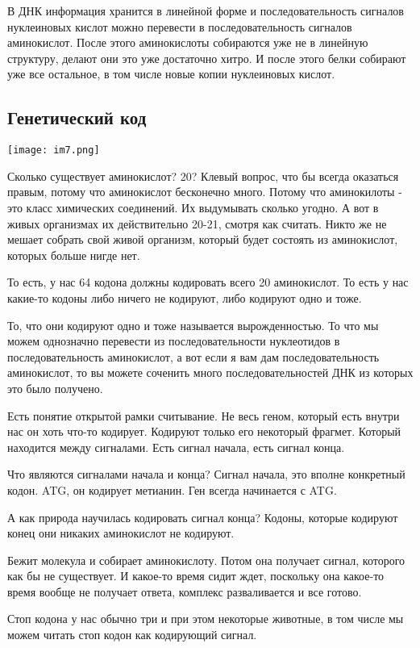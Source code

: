 В ДНК информация хранится в линейной форме и последовательность сигналов
нуклеиновых кислот можно перевести в последовательность сигналов
аминокислот. После этого аминокислоты собираются уже не в линейную структуру,
делают они это уже достаточно хитро. И после этого белки собирают
уже все остальное, в том числе новые копии нуклеиновых кислот.

  
\subsection{Генетический код}
\texttt{[image: im7.png]}

Сколько существует аминокислот?
20?
Клевый вопрос, что бы всегда оказаться правым, потому что
аминокислот бесконечно много. Потому что аминокилоты - это
класс химических соединений. Их выдумывать сколько угодно.
А вот в живых организмах их действительно 20-21, смотря как 
считать. Никто же не мешает собрать свой живой организм, 
который будет состоять из аминокислот, которых больше нигде нет. 

То есть, у нас 64 кодона должны кодировать всего 20 аминокислот. 
То есть у нас какие-то кодоны либо ничего не кодируют, 
либо кодируют одно и тоже. 

То, что они кодируют одно и тоже называется вырожденностью. 
То что мы можем однозначно перевести из последовательности 
нуклеотидов в последовательность аминокислот, 
а вот если я вам дам последовательность аминокислот, 
то вы можете соченить много 
последовательностей ДНК из которых это было получено. 

Есть понятие открытой рамки считывание. Не весь 
геном, который есть внутри нас он хоть что-то кодирует. 
Кодируют только его некоторый фрагмет. Который 
находится между сигналами. Есть сигнал начала, 
есть сигнал конца. 

Что являются сигналами начала и конца? 
Сигнал начала, это вполне конкретный кодон. ATG, он 
кодирует метианин. Ген всегда начинается с 
ATG. 

А как природа научилась кодировать сигнал конца? Кодоны, 
которые кодируют конец они никаких 
аминокислот не кодируют. 

Бежит молекула и собирает аминокислоту. Потом она получает 
сигнал, которого как бы не существует. И какое-то время сидит ждет, 
поскольку она какое-то время вообще не получает ответа, 
комплекс разваливается и все готово. 

Стоп кодона у нас обычно три и при этом некоторые животные, 
в том числе мы можем читать стоп кодон как кодирующий сигнал. 

